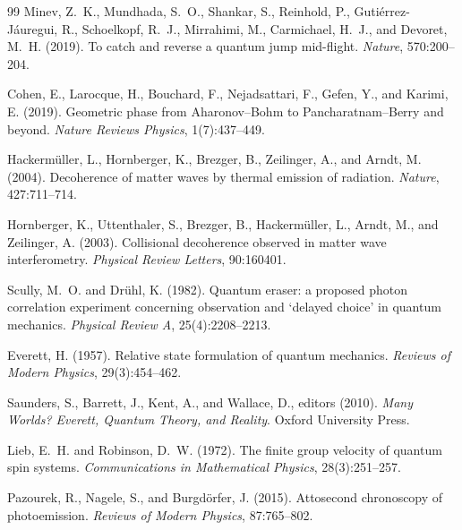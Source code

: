 \documentclass[11pt,a4paper]{article}
\theoremstyle{plain}
\theoremstyle{definition}
\theoremstyle{remark}
\begin{document}
\begin{thebibliography}{99}
Minev, Z.~K., Mundhada, S.~O., Shankar, S., Reinhold, P.,
  Guti\'{e}rrez-J\'{a}uregui, R., Schoelkopf, R.~J., Mirrahimi, M.,
  Carmichael, H.~J., and Devoret, M.~H. (2019).
\newblock To catch and reverse a quantum jump mid-flight.
\newblock \emph{Nature}, 570:200--204.

Cohen, E., Larocque, H., Bouchard, F., Nejadsattari, F., Gefen, Y., and
  Karimi, E. (2019).
\newblock Geometric phase from Aharonov--Bohm to Pancharatnam--Berry and beyond.
\newblock \emph{Nature Reviews Physics}, 1(7):437--449.

Hackerm\"{u}ller, L., Hornberger, K., Brezger, B., Zeilinger, A., and Arndt, M.
  (2004).
\newblock Decoherence of matter waves by thermal emission of radiation.
\newblock \emph{Nature}, 427:711--714.

Hornberger, K., Uttenthaler, S., Brezger, B., Hackerm\"{u}ller, L., Arndt, M.,
  and Zeilinger, A. (2003).
\newblock Collisional decoherence observed in matter wave interferometry.
\newblock \emph{Physical Review Letters}, 90:160401.

Scully, M.~O. and Dr\"{u}hl, K. (1982).
\newblock Quantum eraser: a proposed photon correlation experiment concerning
  observation and `delayed choice' in quantum mechanics.
\newblock \emph{Physical Review A}, 25(4):2208--2213.

Everett, H. (1957).
\newblock Relative state formulation of quantum mechanics.
\newblock \emph{Reviews of Modern Physics}, 29(3):454--462.

Saunders, S., Barrett, J., Kent, A., and Wallace, D., editors (2010).
\newblock \emph{Many Worlds? Everett, Quantum Theory, and Reality}.
\newblock Oxford University Press.

Lieb, E.~H. and Robinson, D.~W. (1972).
\newblock The finite group velocity of quantum spin systems.
\newblock \emph{Communications in Mathematical Physics}, 28(3):251--257.

Pazourek, R., Nagele, S., and Burgd\"{o}rfer, J. (2015).
\newblock Attosecond chronoscopy of photoemission.
\newblock \emph{Reviews of Modern Physics}, 87:765--802.


\end{thebibliography}
\end{document}
